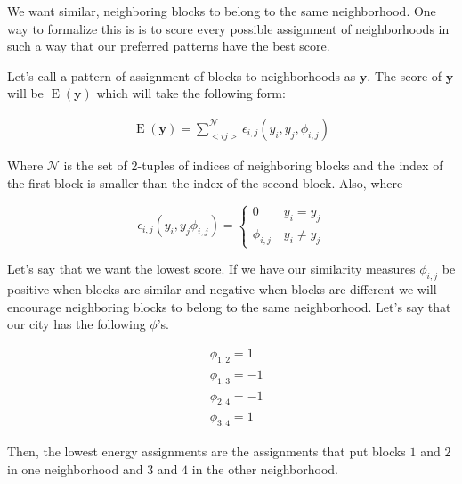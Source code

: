 We want similar, neighboring blocks to belong to the same
neighborhood. One way to formalize this is is to score every possible
assignment of neighborhoods in such a way that our preferred patterns
have the best score.

Let's call a pattern of assignment of blocks to neighborhoods as
$\mathbf{y}$.  The score of $\mathbf{y}$ will be
$\operatorname{E}(\mathbf{y})$ which will take the following form:

\begin{align}
\operatorname{E}(\mathbf{y}) = \sum_{<i j>}^{\mathcal{N}}\epsilon_{i,j}(y_i,y_j,\phi_{i,j})
\end{align}

Where $\mathcal{N}$ is the set of 2-tuples of indices of neighboring
blocks and the index of the first block is smaller than the index of
the second block. Also, where

\begin{equation}
\epsilon_{i,j}(y_i,y_j\phi_{i,j}) = \begin{cases}
  0 \quad\quad y_i = y_j \\
  \phi_{i,j} \quad y_i \neq y_j
\end{cases}
\end{equation}

Let's say that we want the lowest score. If we have our similarity
measures $\phi_{i,j}$ be positive when blocks are similar and negative
when blocks are different we will encourage neighboring blocks to
belong to the same neighborhood. Let's say that our city has the
following $\phi$'s.

\begin{align*}
&\phi_{1,2} = 1 \\
&\phi_{1,3} = -1 \\
&\phi_{2,4} = -1 \\
&\phi_{3,4} = 1
\end{align*} 

Then, the lowest energy assignments are the assignments that put
blocks $1$ and $2$ in one neighborhood and $3$ and $4$ in the other
neighborhood.

\begin{figure}[!h]
\centering


\end{figure}

